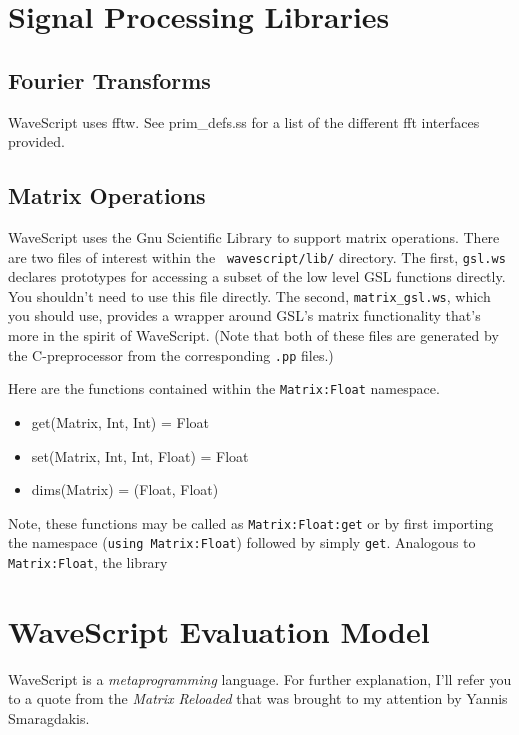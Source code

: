\documentclass[twocolumn]{report}
\begin{document}
\chapter{Signal Processing Libraries}

\section{Fourier Transforms}

WaveScript uses fftw.  See prim\_defs.ss for a list of the different
fft interfaces provided.

\section{Matrix Operations}

WaveScript uses the Gnu Scientific Library to support matrix
operations.  There are two files of interest within the {\tt
wavescript/lib/} directory.  The first, {\tt gsl.ws} declares
prototypes for accessing a subset of the low level GSL functions
directly.  You shouldn't need to use this file directly.  The second,
{\tt matrix\_gsl.ws}, which you should use, provides a wrapper around
GSL's matrix functionality that's more in the spirit of WaveScript.
(Note that both of these files are generated by the C-preprocessor from
the corresponding {\tt .pp} files.)

Here are the functions contained within the {\tt Matrix:Float} namespace.

\begin{itemize}
\item get(Matrix, Int, Int) = Float
\item set(Matrix, Int, Int, Float) = Float
\item dims(Matrix) = (Float, Float)
\end{itemize}

Note, these functions may be called as {\tt Matrix:Float:get} or by
first importing the namespace ({\tt using Matrix:Float}) followed by
simply {\tt get}.  Analogous to {\tt Matrix:Float}, the library 

\chapter{WaveScript Evaluation Model}

WaveScript is a {\em metaprogramming} language.  For further
explanation, I'll refer you to a quote from the {\em Matrix Reloaded}
that was brought to my attention by Yannis Smaragdakis.
\end{document}
